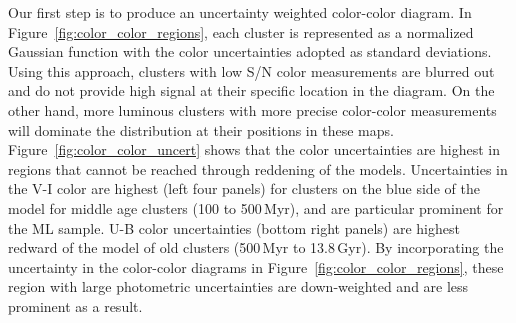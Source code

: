 \documentclass[linenumbers]{aastex63}
\begin{document}
Our first step is to produce an uncertainty weighted color-color diagram. In Figure~\ref{fig:color_color_regions}, each cluster is represented as a 
normalized Gaussian function with the color uncertainties adopted as standard deviations. Using this approach, clusters with low S/N color measurements are blurred out and do not provide high signal at their specific location in the diagram. On the other hand, more luminous clusters with more precise color-color measurements will dominate the distribution at their positions in these maps.  Figure~\ref{fig:color_color_uncert} shows that the color uncertainties are highest in regions that cannot be reached through reddening of the  models.
Uncertainties in the V-I color are highest (left four panels) for clusters on the blue side of the  model for middle age clusters (100 to 500\,Myr), and are particular prominent for the ML sample.   U-B color uncertainties (bottom right panels) are highest redward of the  model of old clusters (500\,Myr to 13.8\,Gyr). %
By incorporating the uncertainty in the color-color diagrams in Figure~\ref{fig:color_color_regions}, these region with large photometric uncertainties are down-weighted and are less prominent as a result.  




\end{document}
